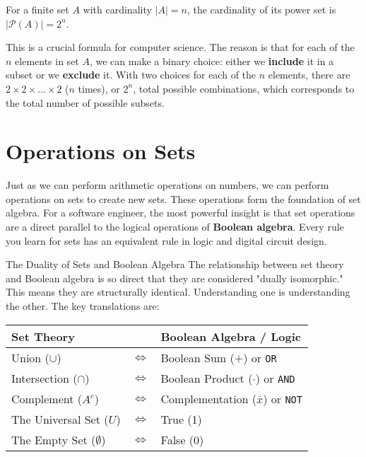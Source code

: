 \begin{remark}
    For a finite set $A$ with cardinality $|A| = n$, the cardinality of its power set is $|\mathcal{P}(A)| = 2^n$.
    
    This is a crucial formula for computer science. The reason is that for each of the $n$ elements in set $A$, we can make a binary choice: either we \textbf{include} it in a subset or we \textbf{exclude} it. With two choices for each of the $n$ elements, there are $2 \times 2 \times \dots \times 2$ ($n$ times), or $2^n$, total possible combinations, which corresponds to the total number of possible subsets.
\end{remark}



\section{Operations on Sets}
Just as we can perform arithmetic operations on numbers, we can perform operations on sets to create new sets. These operations form the foundation of set algebra. For a software engineer, the most powerful insight is that set operations are a direct parallel to the logical operations of \textbf{Boolean algebra}. Every rule you learn for sets has an equivalent rule in logic and digital circuit design.

\begin{custombox}{The Duality of Sets and Boolean Algebra}
    The relationship between set theory and Boolean algebra is so direct that they are considered "dually isomorphic." This means they are structurally identical. Understanding one is understanding the other. The key translations are:
    \begin{center}
    \renewcommand{\arraystretch}{1.3}
    \begin{tabular}{lcl}
        \textbf{Set Theory} & & \textbf{Boolean Algebra / Logic} \\
        \hline
        Union ($\cup$) & $\iff$ & Boolean Sum ($+$) or \texttt{OR} \\
        Intersection ($\cap$) & $\iff$ & Boolean Product ($\cdot$) or \texttt{AND} \\
        Complement ($A^c$) & $\iff$ & Complementation ($\overline{x}$) or \texttt{NOT} \\
        The Universal Set ($U$) & $\iff$ & True (1) \\
        The Empty Set ($\emptyset$) & $\iff$ & False (0) \\
    \end{tabular}
    \end{center}
\end{custombox}

